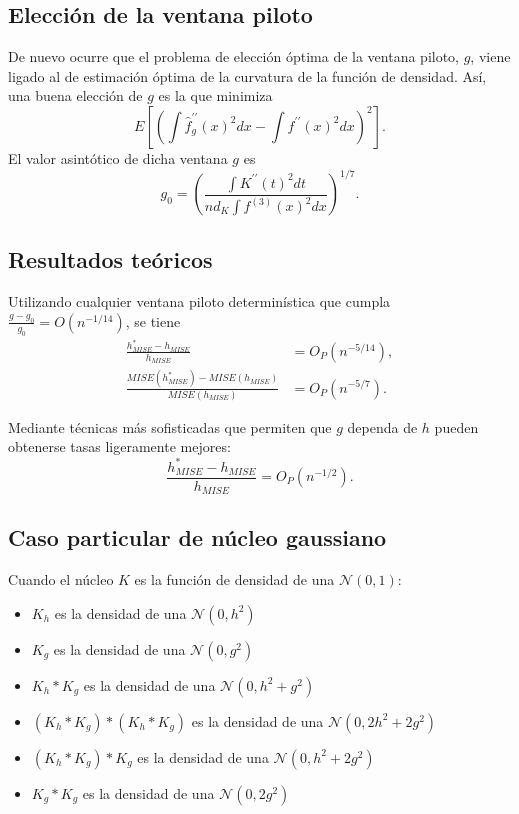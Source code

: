 \documentclass[
]{book}
\theoremstyle{break}
\theoremstyle{nonumberplain}
\begin{document}
\subsection{Elección de la ventana piloto}\label{elecciuxf3n-de-la-ventana-piloto}

De nuevo ocurre que el problema de elección óptima de la ventana piloto,
\(g\), viene ligado al de estimación óptima de la curvatura de la función
de densidad. Así, una buena elección de \(g\) es la que
minimiza\[E\left[ \left( \int \hat{f}_{g}^{\prime \prime }\left( x \right)^2dx-\int
f^{\prime \prime }\left( x \right)^2dx \right)^2\right] .\]El valor
asintótico de dicha ventana \(g\)
es\[g_{0}=\left( \frac{\int K^{\prime \prime }\left( t \right)^2dt}{nd_{K}\int
f^{\left( 3 \right)}\left( x \right)^2dx} \right)^{1/7}.\]

\subsection{Resultados teóricos}\label{resultados-teuxf3ricos}

Utilizando cualquier ventana piloto determinística que cumpla
\(\frac{g-g_{0}}{g_{0}}=O\left( n^{-1/14} \right)\), se tiene
\[\begin{aligned}
\frac{h_{MISE}^{\ast}-h_{MISE}}{h_{MISE}} &= O_{P}\left( n^{-5/14} \right),\\
\frac{MISE\left( h_{MISE}^{\ast} \right) -MISE\left( h_{MISE} \right)}{
MISE\left( h_{MISE} \right)} &= O_{P}\left( n^{-5/7} \right).
\end{aligned}\]

Mediante técnicas más sofisticadas que permiten que \(g\) dependa de
\(h\) pueden obtenerse tasas ligeramente
mejores:\[\frac{h_{MISE}^{\ast}-h_{MISE}}{h_{MISE}}=O_{P}\left( n^{-1/2} \right).\]

\subsection{Caso particular de núcleo gaussiano}\label{caso-particular-de-nuxfacleo-gaussiano}

Cuando el núcleo \(K\) es la función de densidad de una
\(\mathcal{N}\left( 0,1 \right)\):

\begin{itemize}
\item
  \(K_{h}\) es la densidad de una \(\mathcal{N}\left( 0,h^2 \right)\)
\item
  \(K_{g}\) es la densidad de una \(\mathcal{N}\left( 0,g^2 \right)\)
\item
  \(K_{h}\ast K_{g}\) es la densidad de una
  \(\mathcal{N}\left( 0,h^2+g^2 \right)\)
\item
  \(\left( K_{h}\ast K_{g} \right) \ast \left( K_{h}\ast K_{g} \right)\)
  es la densidad de una \(\mathcal{N}\left( 0,2h^2+2g^2 \right)\)
\item
  \(\left( K_{h}\ast K_{g} \right) \ast K_{g}\) es la densidad de una
  \(\mathcal{N}\left( 0,h^2+2g^2 \right)\)
\item
  \(K_{g}\ast K_{g}\) es la densidad de una \(\mathcal{N}\left( 0,2g^2 \right)\)
\end{itemize}
\end{document}
